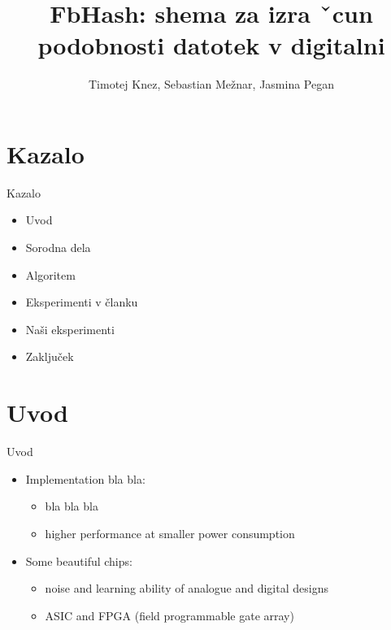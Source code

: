 \documentclass[xcolor=dvipsnames,compress]{beamer}
\title[FbHash]
{FbHash: shema za izra ˇcun podobnosti datotek v digitalni}
\author[Knez, Mežnar, Pegan] %
{Timotej Knez\inst{1},  Sebastian Mežnar\inst{2}, Jasmina Pegan\inst{1}}
\institute[UL FRI, UL FMF] %
{
  \inst{1}%
  Fakulteta za računalništvo in informatiko\\
  Univerza v Ljubljana
  \and
  \inst{2}%
  Fakulteta za matematiko in fiziko\\
  Univerza v Ljubljana
}
\date[DigFor20] %
{}
\begin{document}
\begin{frame}
\titlepage
\end{frame}
\section{Kazalo}
\label{sec:kazalo}

\begin{frame}{Kazalo}
\begin{itemize}
  \item Uvod
  \item Sorodna dela
  \item Algoritem
  \item Eksperimenti v članku
  \item Naši eksperimenti
  \item Zaključek
\end{itemize}
\end{frame}


\section{Uvod}
\label{sec:uvod}

\begin{frame}{Uvod}
\begin{itemize}
	\item Implementation bla bla: 
	\begin{itemize}
		\item bla bla bla
		\item higher performance at smaller power consumption 
	\end{itemize}
	\pause
	\item Some beautiful chips:
	\begin{itemize}
		\item noise and learning ability of analogue and digital designs
		\item ASIC and FPGA (field programmable gate array)
	\end{itemize}
\end{itemize}
\end{frame}



\end{document}
